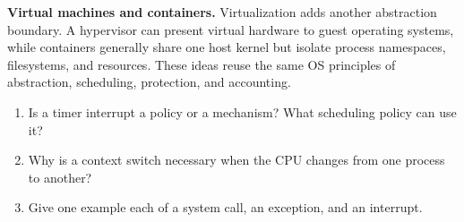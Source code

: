 \begin{optionaltopic}
\textbf{Virtual machines and containers.} Virtualization adds another abstraction boundary. A hypervisor can present virtual hardware to guest operating systems, while containers generally share one host kernel but isolate process namespaces, filesystems, and resources. These ideas reuse the same OS principles of abstraction, scheduling, protection, and accounting.
\end{optionaltopic}

\begin{quickcheck}
\begin{enumerate}
  \item Is a timer interrupt a policy or a mechanism? What scheduling policy can use it?
  \item Why is a context switch necessary when the CPU changes from one process to another?
  \item Give one example each of a system call, an exception, and an interrupt.
\end{enumerate}
\end{quickcheck}
